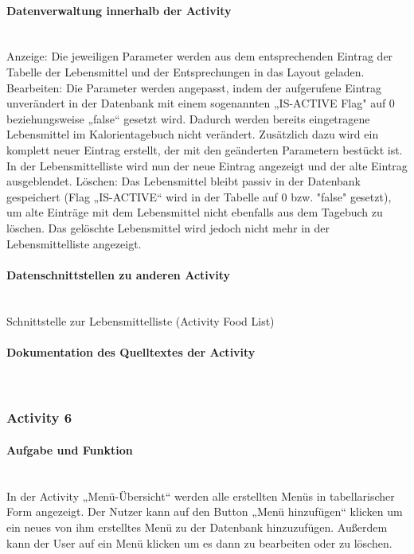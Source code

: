 \paragraph{Datenverwaltung innerhalb der Activity}\\
Anzeige: Die jeweiligen Parameter werden aus dem entsprechenden Eintrag der Tabelle der Lebensmittel und der Entsprechungen in das Layout geladen. 
Bearbeiten: Die Parameter werden angepasst, indem der aufgerufene Eintrag unverändert in der Datenbank mit einem sogenannten „IS-ACTIVE Flag" auf 0 beziehungsweise „false“ gesetzt wird. Dadurch werden bereits eingetragene Lebensmittel im Kalorientagebuch nicht verändert. Zusätzlich dazu wird ein komplett neuer Eintrag erstellt, der mit den geänderten Parametern bestückt ist. In der Lebensmittelliste wird nun der neue Eintrag angezeigt und der alte Eintrag ausgeblendet. 
Löschen: Das Lebensmittel bleibt passiv in der Datenbank gespeichert (Flag „IS-ACTIVE“ wird in der Tabelle auf 0 bzw. "false" gesetzt), um alte Einträge mit dem Lebensmittel nicht ebenfalls aus dem Tagebuch zu löschen. Das gelöschte Lebensmittel wird jedoch nicht mehr in der Lebensmittelliste angezeigt.

\paragraph{Datenschnittstellen zu anderen Activity}\\
Schnittstelle zur Lebensmittelliste (Activity Food List)

\paragraph{Dokumentation des Quelltextes der Activity}\\

\subsubsection{Activity 6}

\paragraph{Aufgabe und Funktion}\\
In der Activity „Menü-Übersicht“ werden alle erstellten Menüs in tabellarischer Form angezeigt. Der Nutzer kann auf den Button „Menü hinzufügen“ klicken um ein neues von ihm erstelltes Menü zu der Datenbank hinzuzufügen. Außerdem kann der User auf ein Menü klicken um es dann zu bearbeiten oder zu löschen.

